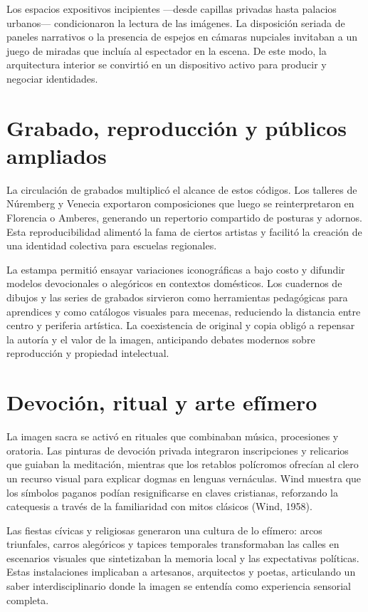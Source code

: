 Los espacios expositivos incipientes —desde capillas privadas hasta palacios urbanos— condicionaron la lectura de las imágenes. La disposición seriada de paneles narrativos o la presencia de espejos en cámaras nupciales invitaban a un juego de miradas que incluía al espectador en la escena. De este modo, la arquitectura interior se convirtió en un dispositivo activo para producir y negociar identidades.

\section{Grabado, reproducción y públicos ampliados}
La circulación de grabados multiplicó el alcance de estos códigos. Los talleres de Núremberg y Venecia exportaron composiciones que luego se reinterpretaron en Florencia o Amberes, generando un repertorio compartido de posturas y adornos. Esta reproducibilidad alimentó la fama de ciertos artistas y facilitó la creación de una identidad colectiva para escuelas regionales.

La estampa permitió ensayar variaciones iconográficas a bajo costo y difundir modelos devocionales o alegóricos en contextos domésticos. Los cuadernos de dibujos y las series de grabados sirvieron como herramientas pedagógicas para aprendices y como catálogos visuales para mecenas, reduciendo la distancia entre centro y periferia artística. La coexistencia de original y copia obligó a repensar la autoría y el valor de la imagen, anticipando debates modernos sobre reproducción y propiedad intelectual.

\section{Devoción, ritual y arte efímero}
La imagen sacra se activó en rituales que combinaban música, procesiones y oratoria. Las pinturas de devoción privada integraron inscripciones y relicarios que guiaban la meditación, mientras que los retablos polícromos ofrecían al clero un recurso visual para explicar dogmas en lenguas vernáculas. Wind muestra que los símbolos paganos podían resignificarse en claves cristianas, reforzando la catequesis a través de la familiaridad con mitos clásicos (Wind, 1958).

Las fiestas cívicas y religiosas generaron una cultura de lo efímero: arcos triunfales, carros alegóricos y tapices temporales transformaban las calles en escenarios visuales que sintetizaban la memoria local y las expectativas políticas. Estas instalaciones implicaban a artesanos, arquitectos y poetas, articulando un saber interdisciplinario donde la imagen se entendía como experiencia sensorial completa.

